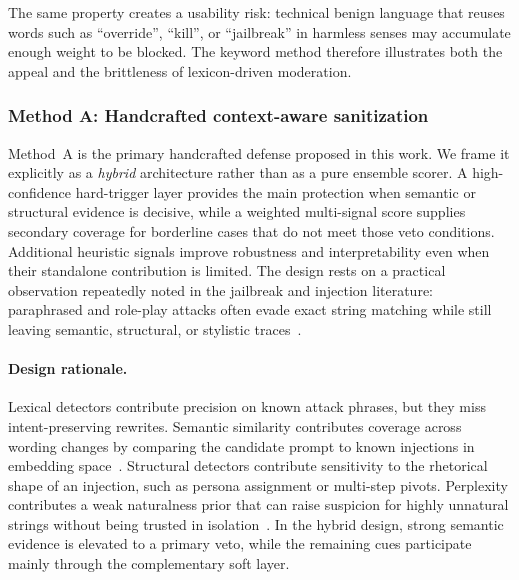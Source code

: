 The same property creates a usability risk: technical benign language that reuses words such as ``override'', ``kill'', or ``jailbreak'' in harmless senses may accumulate enough weight to be blocked.
The keyword method therefore illustrates both the appeal and the brittleness of lexicon-driven moderation.

\subsubsection{Method A: Handcrafted context-aware sanitization}
\label{sec:method-a}

Method~A is the primary handcrafted defense proposed in this work.
We frame it explicitly as a \emph{hybrid} architecture rather than as a pure ensemble scorer.
A high-confidence hard-trigger layer provides the main protection when semantic or structural evidence is decisive, while a weighted multi-signal score supplies secondary coverage for borderline cases that do not meet those veto conditions.
Additional heuristic signals improve robustness and interpretability even when their standalone contribution is limited.
The design rests on a practical observation repeatedly noted in the jailbreak and injection literature: paraphrased and role-play attacks often evade exact string matching while still leaving semantic, structural, or stylistic traces~\cite{wang2025promptsleuth,kholkar2025capture,yi2024jailbreak,bair2025prompt}.

\paragraph{Design rationale.}
Lexical detectors contribute precision on known attack phrases, but they miss intent-preserving rewrites.
Semantic similarity contributes coverage across wording changes by comparing the candidate prompt to known injections in embedding space~\cite{reimers2019sentence,wang2020minilm}.
Structural detectors contribute sensitivity to the rhetorical shape of an injection, such as persona assignment or multi-step pivots.
Perplexity contributes a weak naturalness prior that can raise suspicion for highly unnatural strings without being trusted in isolation~\cite{radford2019language}.
In the hybrid design, strong semantic evidence is elevated to a primary veto, while the remaining cues participate mainly through the complementary soft layer.

